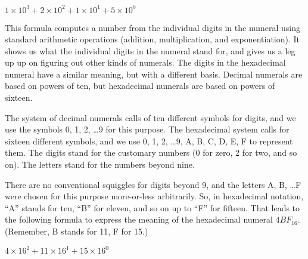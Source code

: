 \begin{center}
$1 \times 10^3 + 2 \times 10^2 + 1 \times 10^1 + 5 \times 10^0$
\end{center}

This formula computes a number from the individual digits
in the numeral using standard arithmetic operations
(addition, multiplication, and exponentiation).
It shows us what the individual digits in the numeral stand for,
and gives us a leg up up on figuring out other kinds of numerals.
The digits in the hexadecimal numeral have a similar meaning,
but with a different basis. Decimal numerals are based on
powers of ten, but hexadecimal numerals are based on powers of sixteen.

The system of decimal numerals calls of ten different symbols for digits,
and we use the symbols 0, 1, 2, \dots 9 for this purpose.
The hexadecimal system calls for sixteen different symbols,
and we use 0, 1, 2, \dots 9, A, B, C, D, E, F to represent them.
The digits stand for the customary numbers (0 for zero, 2 for two,
and so on). The letters stand for the numbers beyond nine.

There are no conventional squiggles for digits beyond 9, and
the letters A, B, \dots F were chosen for this purpose more-or-less arbitrarily.
So, in hexadecimal notation, ``A'' stands for ten, ``B'' for eleven,
and so on up to ``F'' for fifteen. That leads to the following
formula to express the meaning of the hexadecimal numeral $4BF_{16}$.
(Remember, B stands for 11, F for 15.)
\begin{center}
$4 \times 16^2 + 11 \times 16^1 + 15 \times 16^0$
\end{center}

